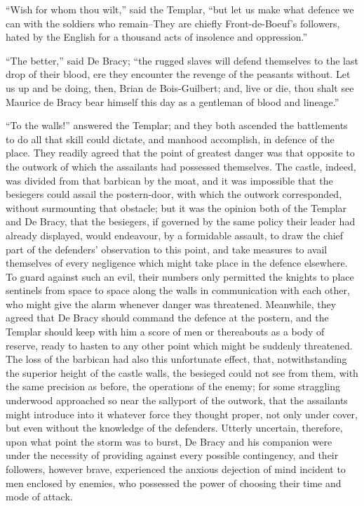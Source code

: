 ``Wish for whom thou wilt,'' said the Templar, ``but let us make what
defence we can with the soldiers who remain--They are chiefly
Front-de-Boeuf's followers, hated by the English for a thousand acts of
insolence and oppression.''

``The better,'' said De Bracy; ``the rugged slaves will defend
themselves to the last drop of their blood, ere they encounter the
revenge of the peasants without. Let us up and be doing, then, Brian de
Bois-Guilbert; and, live or die, thou shalt see Maurice de Bracy bear
himself this day as a gentleman of blood and lineage.''

``To the walls!'' answered the Templar; and they both ascended the
battlements to do all that skill could dictate, and manhood accomplish,
in defence of the place. They readily agreed that the point of greatest
danger was that opposite to the outwork of which the assailants had
possessed themselves. The castle, indeed, was divided from that barbican
by the moat, and it was impossible that the besiegers could assail the
postern-door, with which the outwork corresponded, without surmounting
that obstacle; but it was the opinion both of the Templar and De Bracy,
that the besiegers, if governed by the same policy their leader had
already displayed, would endeavour, by a formidable assault, to draw the
chief part of the defenders' observation to this point, and take
measures to avail themselves of every negligence which might take place
in the defence elsewhere. To guard against such an evil, their numbers
only permitted the knights to place sentinels from space to space along
the walls in communication with each other, who might give the alarm
whenever danger was threatened. Meanwhile, they agreed that De Bracy
should command the defence at the postern, and the Templar should keep
with him a score of men or thereabouts as a body of reserve, ready to
hasten to any other point which might be suddenly threatened. The loss
of the barbican had also this unfortunate effect, that, notwithstanding
the superior height of the castle walls, the besieged could not see from
them, with the same precision as before, the operations of the enemy;
for some straggling underwood approached so near the sallyport of the
outwork, that the assailants might introduce into it whatever force they
thought proper, not only under cover, but even without the knowledge of
the defenders. Utterly uncertain, therefore, upon what point the storm
was to burst, De Bracy and his companion were under the necessity of
providing against every possible contingency, and their followers,
however brave, experienced the anxious dejection of mind incident to men
enclosed by enemies, who possessed the power of choosing their time and
mode of attack.

